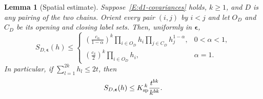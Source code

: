 \documentclass[12pt]{article}
\numberwithin{equation}{section}
\newtheorem{lemma}[theorem]{Lemma}
\theoremstyle{definition}
\begin{document}
\begin{lemma}[Spatial estimate]\label{L:d1-spatial}
  Suppose~\eqref{E:d1-covariances} holds, $k\ge1$, and $D$ is any
  pairing of the two chains. Orient every pair $(i,j)$ by $i<j$ and
  let $O_D$ and $C_D$ be its opening and closing label sets. Then,
  uniformly in $\boldsymbol\epsilon$,
  \begin{equation}\label{E:d1-spatial-product}
    S_{D,\boldsymbol\epsilon}(h)\le
    \begin{cases}
      \displaystyle\left(\frac{c_\alpha}{1-\alpha}\right)^k
      \prod_{i\in O_D}h_i\prod_{j\in C_D}h_j^{1-\alpha},
      &0<\alpha<1,\\[2mm]
      \displaystyle\left(\frac{c_\delta}{2}\right)^k
      \prod_{i\in O_D}h_i,&\alpha=1.
    \end{cases}
  \end{equation}
  In particular, if $\sum_{l=1}^{2k}h_l\le2t$, then
  \begin{equation}\label{E:d1-spatial-max}
    S_{D,\boldsymbol\epsilon}(h)
    \le K_{\rm sp}^{\,k}\frac{t^{bk}}{k^{bk}}.
  \end{equation}
\end{lemma}
\end{document}
